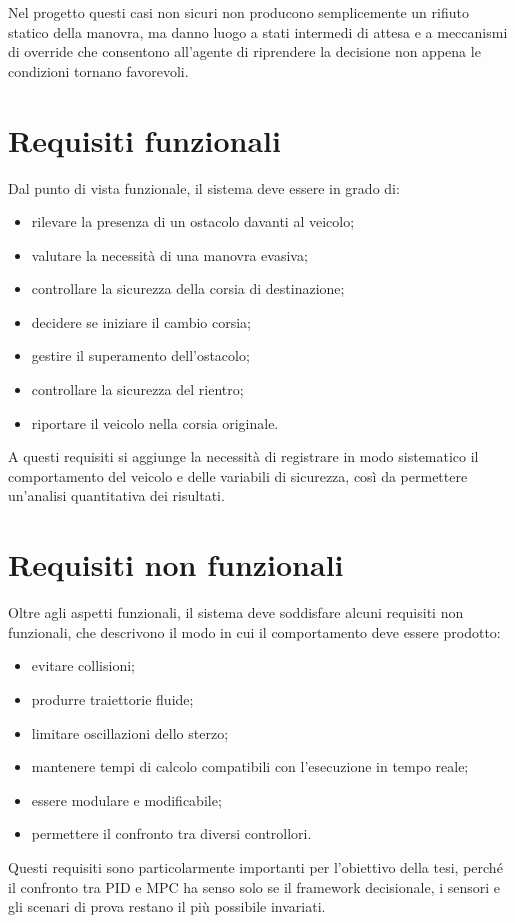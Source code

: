 Nel progetto questi casi non sicuri non producono semplicemente un rifiuto statico della manovra, ma danno luogo a stati intermedi di attesa e a meccanismi di override che consentono all'agente di riprendere la decisione non appena le condizioni tornano favorevoli.

\section{Requisiti funzionali}

Dal punto di vista funzionale, il sistema deve essere in grado di:

\begin{itemize}
    \item rilevare la presenza di un ostacolo davanti al veicolo;
    \item valutare la necessità di una manovra evasiva;
    \item controllare la sicurezza della corsia di destinazione;
    \item decidere se iniziare il cambio corsia;
    \item gestire il superamento dell'ostacolo;
    \item controllare la sicurezza del rientro;
    \item riportare il veicolo nella corsia originale.
\end{itemize}

A questi requisiti si aggiunge la necessità di registrare in modo sistematico il comportamento del veicolo e delle variabili di sicurezza, così da permettere un'analisi quantitativa dei risultati.

\section{Requisiti non funzionali}

Oltre agli aspetti funzionali, il sistema deve soddisfare alcuni requisiti non funzionali, che descrivono il modo in cui il comportamento deve essere prodotto:

\begin{itemize}
    \item evitare collisioni;
    \item produrre traiettorie fluide;
    \item limitare oscillazioni dello sterzo;
    \item mantenere tempi di calcolo compatibili con l'esecuzione in tempo reale;
    \item essere modulare e modificabile;
    \item permettere il confronto tra diversi controllori.
\end{itemize}

Questi requisiti sono particolarmente importanti per l'obiettivo della tesi, perché il confronto tra PID e MPC ha senso solo se il framework decisionale, i sensori e gli scenari di prova restano il più possibile invariati.
